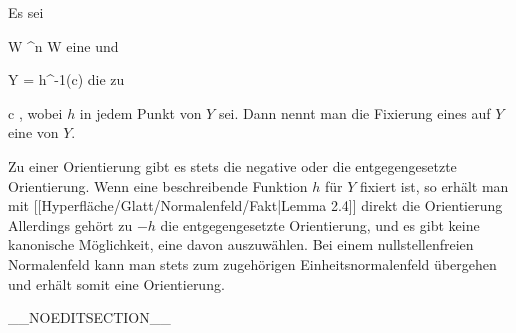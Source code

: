 {}
{

Es sei

\mavergleichskette
{\vergleichskette
{ W
}
{ \subseteq }{ \R^n
}
{  }{
}
{    }{
}
{   }{
}
}
{}{}{}
 { W } { \R
} {}
eine
und

\mavergleichskette
{\vergleichskette
{ Y
}
{ = }{ h^{-1}(c)
}
{  }{
}
{    }{
}
{   }{
}
}
{}{}{}
die
zu

\mavergleichskette
{\vergleichskette
{ c
}
{ \in }{ \R
}
{  }{
}
{    }{
}
{   }{
}
}
{}{}{,}
wobei $h$ in jedem Punkt von $Y$
sei. Dann nennt man die Fixierung eines
auf $Y$ eine
von $Y$.

}

Zu einer Orientierung gibt es stets die negative oder die entgegengesetzte Orientierung. Wenn eine beschreibende Funktion $h$ für $Y$ fixiert ist, so erhält man mit
[[Hyperfläche/Glatt/Normalenfeld/Fakt|Lemma 2.4]]
direkt die Orientierung
 Allerdings gehört zu $-h$ die entgegengesetzte Orientierung, und es gibt keine kanonische Möglichkeit, eine davon auszuwählen. Bei einem nullstellenfreien Normalenfeld kann man stets zum zugehörigen Einheitsnormalenfeld übergehen und erhält somit eine Orientierung.

__NOEDITSECTION__

